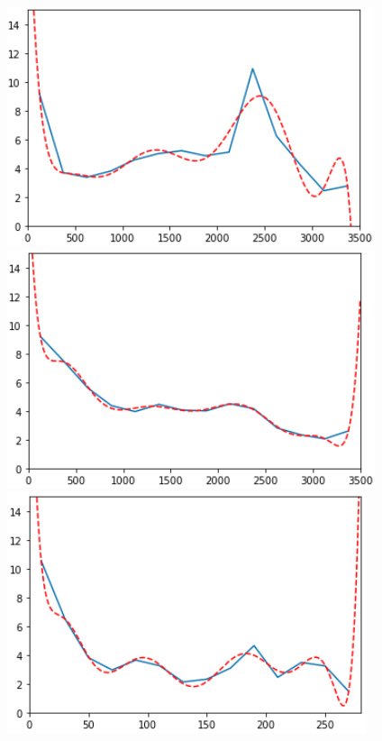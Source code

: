 \begin{figure}[H]
	\begin{minipage}{0.32\textwidth}
		\centering
		\includegraphics[width=1\linewidth]{Book/figures/6_approx_distancia/ensemble_overfitting_0.png}
	\end{minipage}\hfill
	\begin{minipage}{0.32\textwidth}
		\centering
		\includegraphics[width=1\linewidth]{Book/figures/6_approx_distancia/ensemble_overfitting_1.png}
	\end{minipage}\hfill
	\begin{minipage}{0.32\textwidth}
		\centering
		\includegraphics[width=1\linewidth]{Book/figures/6_approx_distancia/ensemble_overfitting_2.png}

\end{minipage}
\end{figure}

